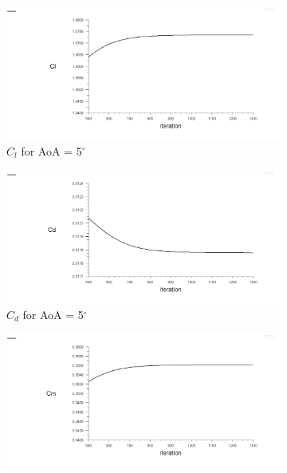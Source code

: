 \begin{figure}[H]
  \begin{subfigure}[b]{0.5\textwidth}
    \includegraphics[width=\textwidth]{5_deg/AoA_5_cl.png}
    \caption{$C_l$ for AoA = 5$^\circ$}
    \label{fig:aoa_5_cl}
  \end{subfigure}
  \hfill
  \begin{subfigure}[b]{0.5\textwidth}
    \includegraphics[width=\textwidth]{5_deg/AoA_5_cd.png}
    \caption{$C_d$ for AoA = 5$^\circ$}
    \label{fig:aoa_5_cd}
  \end{subfigure}
  \begin{subfigure}[b]{0.5\textwidth}
    \includegraphics[width=\textwidth]{5_deg/AoA_5_cm.png}

\end{subfigure}
\end{figure}
